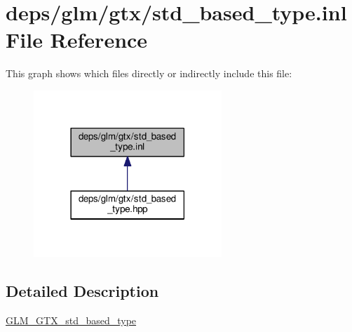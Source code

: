 \hypertarget{std__based__type_8inl}{}\section{deps/glm/gtx/std\+\_\+based\+\_\+type.inl File Reference}
\label{std__based__type_8inl}
This graph shows which files directly or indirectly include this file\+:
\nopagebreak
\begin{figure}[H]
\begin{center}
\leavevmode
\includegraphics[width=201pt]{d1/df0/std__based__type_8inl__dep__incl}
\end{center}
\end{figure}


\subsection{Detailed Description}
\hyperlink{group__gtx__std__based__type}{G\+L\+M\+\_\+\+G\+T\+X\+\_\+std\+\_\+based\+\_\+type} 